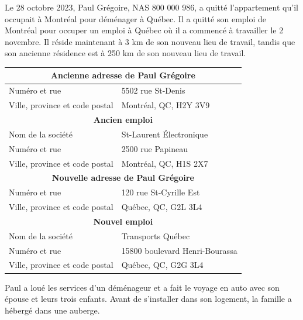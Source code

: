 \begin{question}
	Le 28 octobre 2023, Paul Grégoire, NAS 800 000 986, a quitté l'appartement qu'il occupait à Montréal  pour déménager à Québec. Il a quitté son emploi de Montréal pour occuper un emploi à Québec où il a commencé à travailler le 2 novembre. Il réside maintenant à 3 km de son nouveau lieu de travail, tandis que son ancienne résidence est à 250 km de son nouveau lieu de travail.
	
	\begin{center}
		\begin{tabular}{|l|l|}
			\hline
			\multicolumn{2}{|c|}{\textbf{Ancienne adresse de Paul Grégoire}} \\ \hline
			Numéro et rue                  & 5502 rue St-Denis               \\ \hline
			Ville, province et code postal & Montréal, QC, H2Y 3V9           \\ \hline
			\multicolumn{2}{|c|}{\textbf{Ancien emploi}}                     \\ \hline
			Nom de la société              & St-Laurent Électronique         \\ \hline
			Numéro et rue                  & 2500 rue Papineau               \\ \hline
			Ville, province et code postal & Montréal, QC, H1S 2X7           \\ \hline
			\multicolumn{2}{|c|}{\textbf{Nouvelle adresse de Paul Grégoire}} \\ \hline
			Numéro et rue                  & 120 rue St-Cyrille Est          \\ \hline
			Ville, province et code postal & Québec, QC, G2L 3L4             \\ \hline
			\multicolumn{2}{|c|}{\textbf{Nouvel emploi}}                     \\ \hline
			Nom de la société              & Transports Québec               \\ \hline
			Numéro et rue                  & 15800 boulevard Henri-Bourassa  \\ \hline
			Ville, province et code postal & Québec, QC, G2G 3L4             \\ \hline
		\end{tabular}
	\end{center}
	
	Paul a loué les services d'un déménageur et a fait le voyage en auto avec son épouse et leurs trois enfants. Avant de s'installer dans son logement, la famille a hébergé dans une auberge.
	

\end{question}
